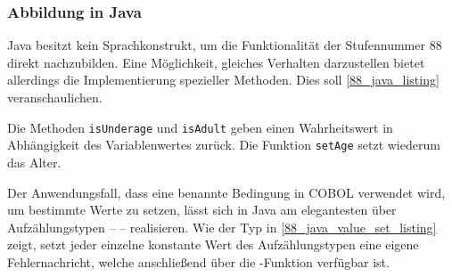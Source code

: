 \subsubsection*{Abbildung in Java}
Java besitzt kein Sprachkonstrukt, um die Funktionalität der Stufennummer 88 direkt nachzubilden. Eine Möglichkeit, gleiches Verhalten darzustellen bietet allerdings die Implementierung spezieller Methoden. Dies soll \autoref{88_java_listing} veranschaulichen.


Die Methoden \texttt{isUnderage} und \texttt{isAdult} geben einen Wahrheitswert in Abhängigkeit des Variablenwertes zurück. Die Funktion \texttt{setAge} setzt wiederum das Alter.


Der Anwendungsfall, dass eine benannte Bedingung in COBOL verwendet wird, um bestimmte Werte zu setzen, lässt sich in Java am elegantesten über Aufzählungstypen --  -- realisieren. Wie der Typ  in \autoref{88_java_value_set_listing} zeigt, setzt jeder einzelne konstante Wert des Aufzählungstypen eine eigene Fehlernachricht, welche anschließend über die -Funktion verfügbar ist.